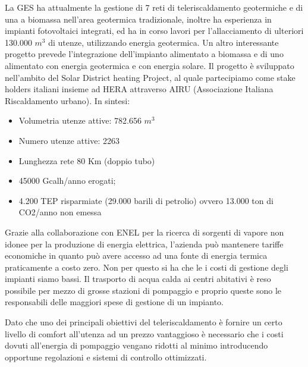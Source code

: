 \documentclass[laurea,oneside,11pt]{USiena_tesiLM3}
\begin{document}
La GES ha attualmente la gestione di 7 reti di teleriscaldamento geotermiche e di una a biomassa nell'area geotermica tradizionale, inoltre ha esperienza in impianti fotovoltaici integrati, ed ha in corso lavori per l'allacciamento di ulteriori 130.000 $m^3$ di utenze, utilizzando energia geotermica. Un altro interessante progetto prevede l'integrazione dell'impianto alimentato a biomassa e di uno alimentato con energia geotermica e con energia solare. Il progetto è sviluppato nell'ambito del Solar District heating Project, al quale partecipiamo come stake holders italiani insieme ad HERA attraverso AIRU (Associazione Italiana Riscaldamento urbano).
In sintesi:
\begin{itemize}
\item Volumetria utenze attive: 782.656 $m^3$
\item Numero utenze attive: 2263
\item Lunghezza rete 80 Km (doppio tubo)
\item 45000 Gcalh/anno erogati; 
\item 4.200 TEP risparmiate (29.000 barili di petrolio) ovvero 13.000 ton di CO2/anno non emessa
\end{itemize}


Grazie alla collaborazione con ENEL per la ricerca di sorgenti di vapore non idonee per la produzione di energia elettrica, l'azienda può  mantenere tariffe economiche in quanto può avere accesso ad una fonte di energia termica praticamente a costo zero. Non per questo si ha che le i costi di gestione degli impianti siamo bassi. Il trasporto di acqua calda ai centri abitativi è reso possibile per mezzo di grosse stazioni di pompaggio e proprio queste sono le responsabili delle maggiori spese di gestione di un impianto. 

Dato che uno dei principali obiettivi del teleriscaldamento è fornire un certo livello di comfort all'utenza ad un prezzo vantaggioso è necessario che i costi dovuti all'energia di pompaggio vengano ridotti al minimo introducendo opportune regolazioni e sistemi di controllo ottimizzati. 
\end{document}
